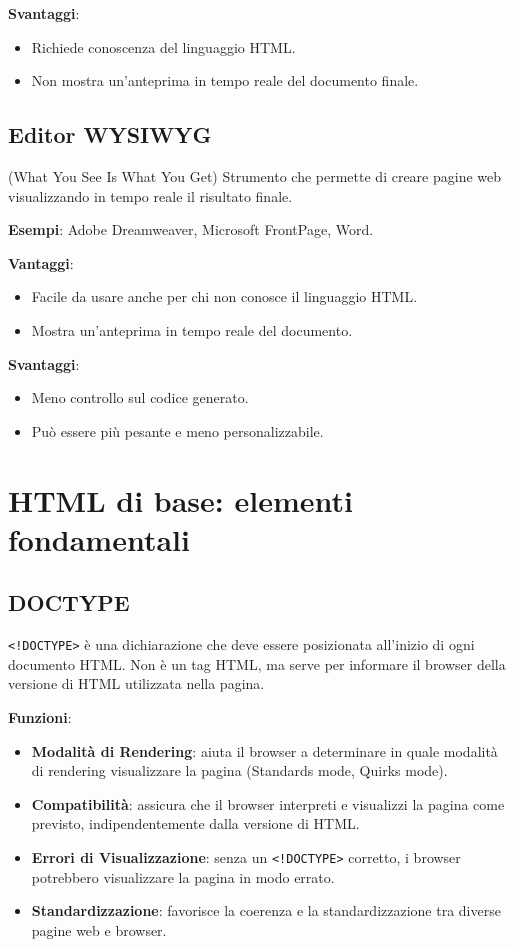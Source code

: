 \textbf{Svantaggi}:
\begin{itemize}
    \item Richiede conoscenza del linguaggio HTML.
    \item Non mostra un'anteprima in tempo reale del documento finale.
\end{itemize}

\subsection{Editor WYSIWYG}

(What You See Is What You Get) Strumento che permette di creare pagine web visualizzando in tempo reale il risultato finale.

\textbf{Esempi}: Adobe Dreamweaver, Microsoft FrontPage, Word.

\textbf{Vantaggi}:
\begin{itemize}
    \item Facile da usare anche per chi non conosce il linguaggio HTML.
    \item Mostra un'anteprima in tempo reale del documento.
\end{itemize}

\textbf{Svantaggi}:
\begin{itemize}
    \item Meno controllo sul codice generato.
    \item Può essere più pesante e meno personalizzabile.
\end{itemize}

\section{HTML di base: elementi fondamentali}

\subsection{DOCTYPE}

\texttt{<!DOCTYPE>} è una dichiarazione che deve essere posizionata all'inizio di ogni documento HTML. Non è un tag HTML, ma serve per informare il browser della versione di HTML utilizzata nella pagina.

\textbf{Funzioni}:
\begin{itemize}
    \item \textbf{Modalità di Rendering}: aiuta il browser a determinare in quale modalità di rendering visualizzare la pagina (Standards mode, Quirks mode).
    \item \textbf{Compatibilità}: assicura che il browser interpreti e visualizzi la pagina come previsto, indipendentemente dalla versione di HTML.
    \item \textbf{Errori di Visualizzazione}: senza un \texttt{<!DOCTYPE>} corretto, i browser potrebbero visualizzare la pagina in modo errato.
    \item \textbf{Standardizzazione}: favorisce la coerenza e la standardizzazione tra diverse pagine web e browser.
\end{itemize}

